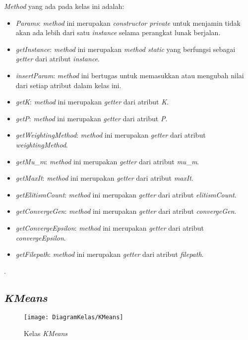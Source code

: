 \textit{Method} yang ada pada kelas ini adalah:

\begin{itemize}
	\item \textit{Params}: \textit{method} ini merupakan \textit{constructor private} untuk menjamin tidak akan ada lebih dari satu \textit{instance} selama perangkat lunak berjalan.
	\item \textit{getInstance}: \textit{method} ini merupakan \textit{method static} yang berfungsi sebagai \textit{getter} dari atribut \textit{instance}.
	\item \textit{insertParam}: \textit{method} ini bertugas untuk memasukkan atau mengubah nilai dari setiap atribut dalam kelas ini.
	\item \textit{getK}: \textit{method} ini merupakan \textit{getter} dari atribut \textit{K}.
	\item \textit{getP}: \textit{method} ini merupakan \textit{getter} dari atribut \textit{P}.
	\item \textit{getWeightingMethod}: \textit{method} ini merupakan \textit{getter} dari atribut \textit{weightingMethod}.
	\item \textit{getMu}\_\textit{m}: \textit{method} ini merupakan \textit{getter} dari atribut \textit{mu}\_\textit{m}.
	\item \textit{getMaxIt}: \textit{method} ini merupakan \textit{getter} dari atribut \textit{maxIt}.
	\item \textit{getElitismCount}: \textit{method} ini merupakan \textit{getter} dari atribut \textit{elitismCount}.
	\item \textit{getConvergeGen}: \textit{method} ini merupakan \textit{getter} dari atribut \textit{convergeGen}.
	\item \textit{getConvergeEpsilon}: \textit{method} ini merupakan \textit{getter} dari atribut \textit{convergeEpsilon}.
	\item \textit{getFilepath}: \textit{method} ini merupakan \textit{getter} dari atribut \textit{filepath}.
\end{itemize}.

\subsection{\textit{KMeans}}

\begin{figure}[H]
	\begin{center}
		\texttt{[image: DiagramKelas/KMeans]}
		\caption{Kelas \textit{KMeans}}
		\label{fig:kelasKMeans}
	\end{center}
\end{figure}

